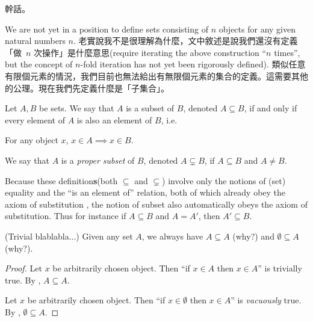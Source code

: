 \begin{remark}
幹話。
\end{remark}

\begin{note}
We are not yet in a position to define sets consisting of \(n\) objects for any given natural numbers \(n\). 老實說我不是很理解為什麼，文中敘述是說我們還沒有定義「做\ \(n\) 次操作」是什麼意思(require iterating the above construction ``\(n\) times'', but the concept of \(n\)-fold iteration has not yet been rigorously defined). 類似任意有限個元素的情況，我們目前也無法給出有無限個元素的集合的定義。這需要其他的公理。現在我們先定義什麼是「子集合」。
\end{note}

\begin{definition}[Subsets] \label{def 3.1.15}
Let \(A, B\) be sets. We say that \(A\) is a subset of \(B\), denoted \(A \subseteq B\), if and only if every element of \(A\) is also an element of \(B\), i.e.
\begin{center}
For any object \(x\), \(x \in A \implies x \in B\).
\end{center}
We say that \(A\) is a \emph{proper subset} of \(B\), denoted \(A \subsetneq B\), if \(A \subseteq B\) and \(A \neq B\).
\end{definition}

\begin{remark} \label{remark 3.1.16}
Because these definition\textbf{s}(both \(\subseteq\) and \(\subsetneq\)) involve only the notions of (set) equality and the “is an element of” relation, both of which already obey the axiom of substitution , the notion of subset also automatically obeys the axiom of substitution. Thus for instance if \(A \subseteq B\) and \(A = A'\), then \(A' \subseteq B\).
\end{remark}

\begin{example} \label{example 3.1.17}
(Trivial blablabla...) Given any set \(A\), we always have \(A \subseteq A\) (why?) and \(\emptyset \subseteq A\) (why?).
\end{example}

\begin{proof}
Let \(x\) be arbitrarily chosen object. Then ``if \(x \in A\) then \(x \in A\)'' is trivially true. By , \(A \subseteq A\).

Let \(x\) be arbitrarily chosen object. Then ``if \(x \in \emptyset\) then \(x \in A\)'' is \emph{vacuously} true. By , \(\emptyset \subseteq A\).
\end{proof}

